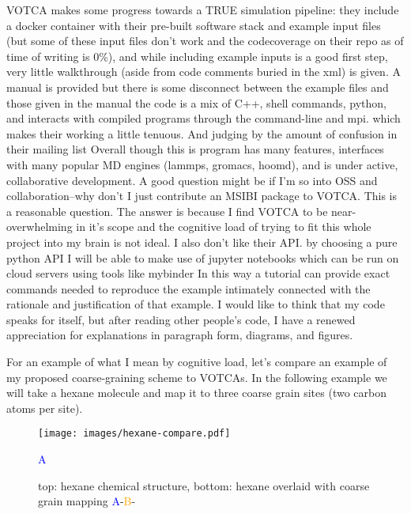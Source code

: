 VOTCA makes some progress towards a TRUE simulation pipeline: they include a docker container with their pre-built software stack and example input files  (but some of these input files don't work and the codecoverage on their repo as of time of writing is 0\%), and while including example inputs is a good first step, very little walkthrough (aside from code comments buried in the xml) is given\cite{votca-github}. %
A manual is provided but there is some disconnect between the example files and those given in the manual %
the code is a mix of C++, shell commands, python, and interacts with compiled programs through the command-line and mpi.
which makes their working a little tenuous.
And judging by the amount of confusion in their mailing list %
Overall though this is program has many features, interfaces with many popular MD engines (lammps, gromacs, hoomd), and is under active, collaborative development.
A good question might be if I'm so into OSS and collaboration--why don't I just contribute an MSIBI package to VOTCA.
This is a reasonable question.
The answer is because I find VOTCA to be near-overwhelming in it's scope and the cognitive load of trying to fit this whole project into my brain is not ideal.
I also don't like their API.
by choosing a pure python API I will be able to make use of jupyter notebooks which can be run on cloud servers using tools like mybinder %
In this way a tutorial can provide exact commands needed to reproduce the example intimately connected with the rationale and justification of that example.
I would like to think that my code speaks for itself, but after reading other people's code, I have a renewed appreciation for explanations in paragraph form, diagrams, and figures.

For an example of what I mean by cognitive load, let's compare an example of my proposed coarse-graining scheme to VOTCAs.
In the following example we will take a hexane molecule and map it to three coarse grain sites (two carbon atoms per site).


\begin{wrapfigure}{L}{0.5\linewidth}
    \centering
    \texttt{[image: images/hexane-compare.pdf]}
    \caption{top: hexane chemical structure, bottom: hexane overlaid with coarse grain mapping \textcolor{blue}{A}-\textcolor{orange}{B}-}\textcolor{blue}{A}
    \label{fig:hexane}
\end{wrapfigure}

